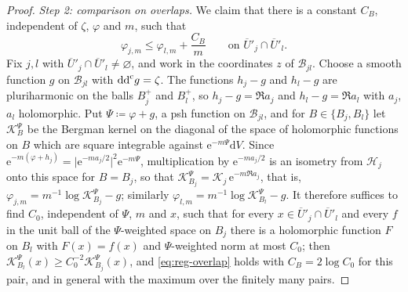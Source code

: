 \documentclass[11pt,a4paper]{amsart}
\theoremstyle{definition}
\begin{document}
\begin{proof}
\emph{Step 2: comparison on overlaps.} We claim that there is a constant
$C_B$, independent of $\zeta$, $\varphi$ and $m$, such that
\begin{equation}\label{eq:reg-overlap}
  \varphi_{j,m}\le\varphi_{l,m}+\frac{C_B}m
  \qquad\text{on }\overline U{}'_j\cap\overline U{}'_l .
\end{equation}
Fix $j,l$ with $\overline U{}'_j\cap\overline U{}'_l\ne\varnothing$, and
work in the coordinates $z$ of $\mathcal B_{jl}$. Choose a smooth function $g$
on $\mathcal B_{jl}$ with $\mathrm{dd}^{\mathrm{c}} g=\zeta$. The functions $h_j-g$ and $h_l-g$ are
pluriharmonic on the balls $B_j^+$ and $B_l^+$, so $h_j-g=\Re a_j$ and
$h_l-g=\Re a_l$ with $a_j$, $a_l$ holomorphic. Put $\Psi\coloneqq\varphi+g$,
a psh function on $\mathcal B_{jl}$, and for $B\in\{B_j,B_l\}$ let $\mathcal K^\Psi_B$
be the Bergman kernel on the diagonal of the space of holomorphic
functions on $B$ which are square integrable against
$\mathrm{e}^{-m\Psi}\mathrm{d}V$. Since
$\mathrm{e}^{-m(\varphi+h_j)}=\bigl|\mathrm{e}^{-ma_j/2}\bigr|^2\mathrm{e}^{-m\Psi}$,
multiplication by $\mathrm{e}^{-ma_j/2}$ is an isometry from $\mathcal H_j$
onto this space for $B=B_j$, so that
$\mathcal K^\Psi_{B_j}=\mathcal K_j\,\mathrm{e}^{-m\Re a_j}$, that is,
$\varphi_{j,m}=m^{-1}\log\mathcal K^\Psi_{B_j}-g$; similarly
$\varphi_{l,m}=m^{-1}\log\mathcal K^\Psi_{B_l}-g$. It therefore suffices to find
$C_0$, independent of $\Psi$, $m$ and $x$, such that for every
$x\in\overline U{}'_j\cap\overline U{}'_l$ and every $f$ in the unit ball
of the $\Psi$-weighted space on $B_j$ there is a holomorphic function $F$
on $B_l$ with $F(x)=f(x)$ and $\Psi$-weighted norm at most $C_0$; then
$\mathcal K^\Psi_{B_l}(x)\ge C_0^{-2}\mathcal K^\Psi_{B_j}(x)$, and \eqref{eq:reg-overlap}
holds with $C_B=2\log C_0$ for this pair, and in general with the maximum
over the finitely many pairs.


\end{proof}
\end{document}
